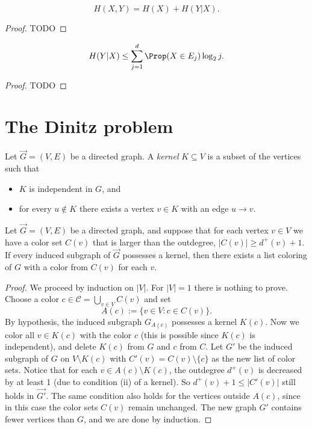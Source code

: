 \begin{theorem}[Fact B]
  \label{ch37fact_b}
  \[H(X, Y) = H(X) + H(Y|X).\]
\end{theorem}
\begin{proof}
  TODO
\end{proof}

\begin{theorem}[Fact B]
  \label{ch37fact_c}
  \[H(Y|X)\le \sum_{j=1}^d \Prop(X\in E_j)\log_2 j.\]
\end{theorem}
\begin{proof}
  TODO
\end{proof}


\chapter{The Dinitz problem}

\begin{definition}
  \label{ch38definition1}
  Let $\vec{G} = (V, E)$ be a directed graph. A \textit{kernel} $K \subseteq V$ is a subset of the vertices such that
\begin{itemize}
    \item[(i)] $K$ is independent in $G$, and
    \item[(ii)] for every $u \notin K$ there exists a vertex $v \in K$ with an edge $u \rightarrow v$.
\end{itemize}
\end{definition}

\begin{lemma}
  \label{ch38lemma1}
  Let $\vec{G} = (V, E)$ be a directed graph, and suppose that for each vertex $v \in V$ we have
  a color set $C(v)$ that is larger than the outdegree, $|C(v)| \geq d^+(v) + 1$.
  If every induced subgraph of $\vec{G}$ possesses a kernel, then there exists a list coloring
  of $G$ with a color from $C(v)$ for each $v$.
\end{lemma}
\begin{proof}
We proceed by induction on $|V|$. For $|V| = 1$ there is nothing to prove. Choose a color
$c \in \mathcal{C} = \bigcup_{v \in V} C(v)$ and set
\[
A(c) := \{v \in V : c \in C(v)\}.
\]
By hypothesis, the induced subgraph $G_{A(c)}$ possesses a kernel $K(c)$. Now we color all
$v \in K(c)$ with the color $c$ (this is possible since $K(c)$ is independent),
and delete $K(c)$ from $G$ and $c$ from $C$. Let $G'$ be the induced subgraph of $G$ on
$V \setminus K(c)$ with $C'(v) = C(v) \setminus \{c\}$ as the new list of color sets.
Notice that for each $v \in A(c) \setminus K(c)$, the outdegree $d^+(v)$ is decreased by at
least 1 (due to condition (ii) of a kernel). So $d^+(v) + 1 \leq |C'(v)|$ still holds in $\vec{G'}$.
The same condition also holds for the vertices outside $A(c)$, since in this case the color
sets $C(v)$ remain unchanged. The new graph $G'$ contains fewer vertices than $G$, and we are done
by induction.
\end{proof}


